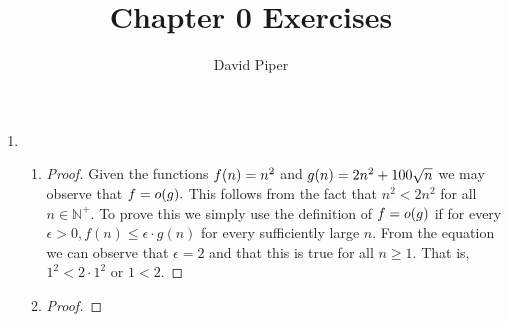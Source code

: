 \documentclass[12pt]{article}
\title{Chapter 0 Exercises}
\author{David Piper}
\makeatletter
\newcommand*{\arabicodd}[1]{%
  \expandafter\@arabicodd\csname c@#1\endcsname
}
\newcommand*{\@arabicodd}[1]{%
  \@arabic{\numexpr(#1)*2-1\relax}%
}
\makeatother
\begin{document}
  \maketitle

  \begin{enumerate}[label=0.\arabicodd*]
    \item
      \begin{enumerate}[label=(\alph*)]
        \item
          \begin{proof}
            Given the functions $f\qty(n)=n^2$ and $g\qty(n)=2n^2+100\sqrt{n}$ we may
            observe that $f=o\qty(g).$ This follows from the fact that $n^2 < 2n^2$
            for all $n \in \mathbb{N}^+.$ To prove this we simply use the definition
            of $f=o\qty(g)$ if for every $\epsilon > 0, f(n) \leq \epsilon \cdot g(n)$
            for every sufficiently large $n.$ From the equation we can observe that $\epsilon=2$
            and that this is true for all $n \geq 1.$ That is, $1^2 < 2 \cdot 1^2$ or
            $1 < 2.$
          \end{proof}
        \item
          \begin{proof}
          \end{proof}
      \end{enumerate}
  \end{enumerate}
\end{document}
